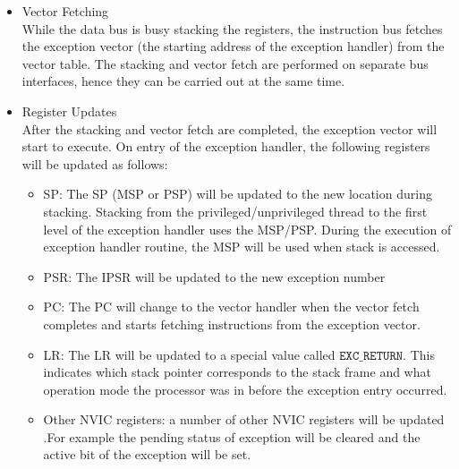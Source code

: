 \begin{itemize}
\item{Vector Fetching} \\
While the data bus is busy stacking the registers, the instruction bus fetches
the exception vector (the starting address of the exception handler) from the vector table. The stacking and vector fetch are performed on separate bus interfaces, hence they can be carried out at the same time.
\item{Register Updates} \\
After the stacking and vector fetch are completed, the exception vector
will start to execute. On entry of the exception handler, the following
registers will be updated as follows:
\begin{itemize}
    \item SP: The SP (MSP or PSP) will be updated to the new location during stacking. Stacking from the privileged/unprivileged thread to the first level of the exception handler uses the MSP/PSP. During the execution of exception handler routine, the MSP will be used when stack is accessed.
    \item PSR: The IPSR will be updated to the new exception number
    \item PC: The PC will change to the vector handler when the vector fetch completes and starts fetching instructions from the exception vector.
    \item LR: The LR will be updated to a special value called $\mathtt{EXC\_RETURN}$. This indicates which stack pointer corresponds to the stack frame and what operation mode the processor was in before the exception entry occurred.  
    \item Other NVIC registers: a number of other NVIC registers will be updated .For example the pending status of exception will be cleared and the active bit of the exception will be set.
\end{itemize}
\end{itemize}
